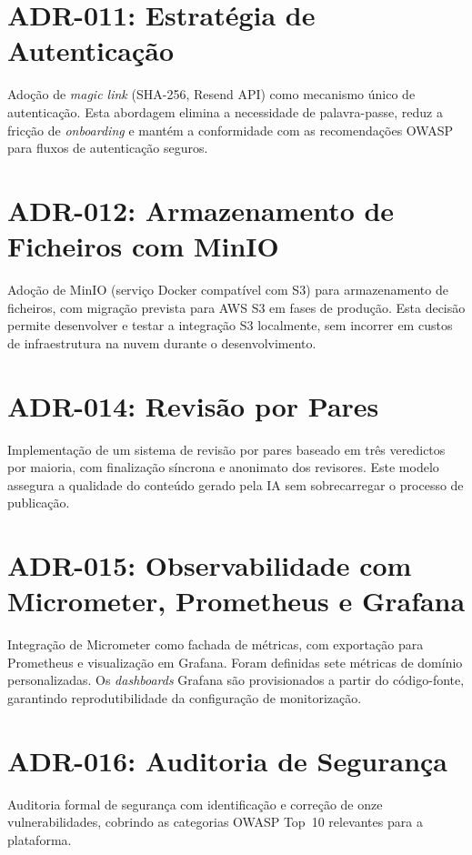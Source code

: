 \section*{ADR-011: Estratégia de Autenticação}
Adoção de \textit{magic link} (SHA-256, Resend API) como mecanismo único de autenticação. Esta abordagem elimina a necessidade de palavra-passe, reduz a fricção de \textit{onboarding} e mantém a conformidade com as recomendações OWASP para fluxos de autenticação seguros.

\section*{ADR-012: Armazenamento de Ficheiros com MinIO}
Adoção de MinIO (serviço Docker compatível com S3) para armazenamento de ficheiros, com migração prevista para AWS S3 em fases de produção. Esta decisão permite desenvolver e testar a integração S3 localmente, sem incorrer em custos de infraestrutura na nuvem durante o desenvolvimento.

\section*{ADR-014: Revisão por Pares}
Implementação de um sistema de revisão por pares baseado em três veredictos por maioria, com finalização síncrona e anonimato dos revisores. Este modelo assegura a qualidade do conteúdo gerado pela IA sem sobrecarregar o processo de publicação.

\section*{ADR-015: Observabilidade com Micrometer, Prometheus e Grafana}
Integração de Micrometer como fachada de métricas, com exportação para Prometheus e visualização em Grafana. Foram definidas sete métricas de domínio personalizadas. Os \textit{dashboards} Grafana são provisionados a partir do código-fonte, garantindo reprodutibilidade da configuração de monitorização.

\section*{ADR-016: Auditoria de Segurança}
Auditoria formal de segurança com identificação e correção de onze vulnerabilidades, cobrindo as categorias OWASP Top~10 relevantes para a plataforma.
